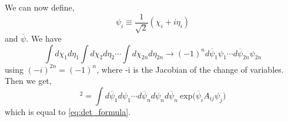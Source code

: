 We can now define, 
\begin{equation}
\psi_{i} \equiv \frac{1}{\sqrt{2}} (\chi_{i} + i \eta_{i})
\end{equation}
and $\overline{\psi}$. We have 
\[ \int d\chi_{1} d\eta_{1}\int d\chi_{2} d\eta_{2} \cdots \int d\chi_{2n} d\eta_{2n}  \to (-1)^{n} d\overline{\psi}_{1}\psi_{1} \cdots d\overline{\psi}_{2n}\psi_{2n} \]
using $ (-i)^{2n} = (-1)^n$, where -i is the Jacobian of the change of variables. Then we get, 
\begin{equation}
[\text{pf}(M)]^{2} =  \int  d\overline{\psi}_{1} d\psi_{1} \cdots d\overline{\psi}_{n} d\psi_{n} d\overline{\psi}_{n} ~ \text{exp}  \Big( \overline{\psi}_{i} A_{ij} \psi_{j}\Big)
\end{equation}
which is equal to \ref{eq:det_formula}. 


















